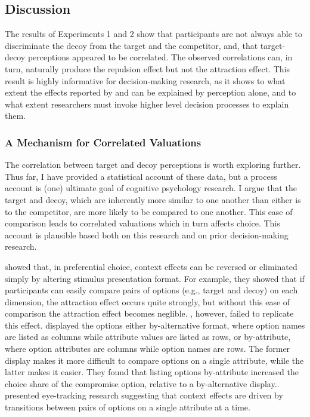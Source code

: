 \subsection{Discussion}

The results of Experiments 1 and 2 show that participants are not always able to discriminate the decoy from the target and the competitor, and, that target-decoy perceptions appeared to be correlated. The observed correlations can, in turn, naturally produce the repulsion effect but not the attraction effect. This result is highly informative for decision-making research, as it shows to what extent the effects reported by \textcite{trueblood2013not} and \textcite{spektorWhenGoodLooks2018b} can be explained by perception alone, and to what extent researchers must invoke higher level decision processes to explain them. 

\subsubsection{A Mechanism for Correlated Valuations}

The correlation between target and decoy perceptions is worth exploring further. Thus far, I have provided a statistical account of these data, but a process account is (one) ultimate goal of cognitive psychology research. I argue that the target and decoy, which are inherently more similar to one another than either is to the competitor, are more likely to be compared to one another. This ease of comparison leads to correlated valuations which in turn affects choice. This account is plausible based both on this research and on prior decision-making research.

\textcite{cataldoComparisonProcessAccount2019b} showed that, in preferential choice, context effects can be reversed or eliminated simply by altering stimulus presentation format. For example, they showed that if participants can easily compare pairs of options (e.g., target and decoy) on each dimension, the attraction effect occurs quite strongly, but without this ease of comparison the attraction effect becomes neglible. \textcite{hasan2025registered}, however, failed to replicate this effect. \textcite{changWhichCompromiseOption2008} displayed the options either by-alternative format, where option names are listed as columns while attribute values are listed as rows, or by-attribute, where option attributes are columns while option names are rows. The former display makes it more difficult to compare options on a single attribute, while the latter makes it easier. They found that listing options by-attribute increased the choice share of the compromise option, relative to a by-alternative display.. \textcite{noguchi2014attraction} presented eye-tracking research suggesting that context effects are driven by transitions between pairs of options on a single attribute at a time. 

